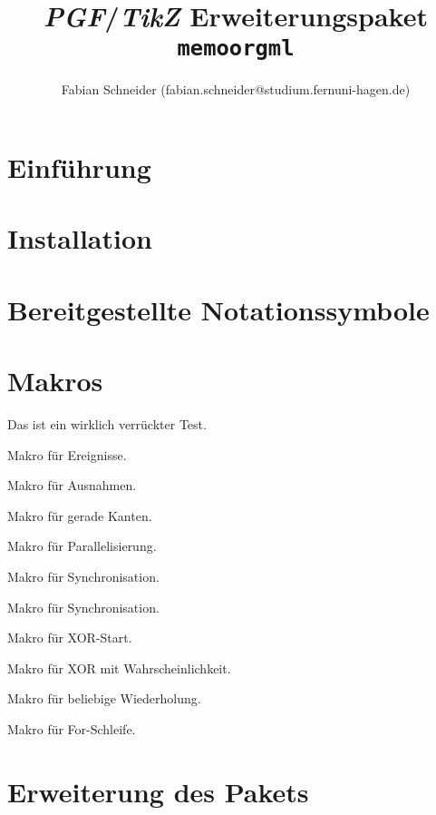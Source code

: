 \documentclass[11pt]{article}
\begin{document}
\begin{titlepage}
\title{\textit{PGF}/\textit{TikZ} Erweiterungspaket \texttt{memoorgml}} 
\author{Fabian Schneider (fabian.schneider@studium.fernuni-hagen.de)}   
\end{titlepage}
\maketitle

\section{Einführung}
\label{sec:Einführung}

\section{Installation}
\label{sec:Installation}

\section{Bereitgestellte Notationssymbole}
\label{sec:Notationssymbole}

\section{Makros}
\label{sec:Makros}
\DescribeMacro{\memoprocess} Das ist ein wirklich verrückter Test.\bigskip

\DescribeMacro{\memoevent} Makro für Ereignisse.\bigskip

\DescribeMacro{\memoexception} Makro für Ausnahmen.\bigskip

\DescribeMacro{\memoconn} Makro für gerade Kanten.\bigskip

\DescribeMacro{\memoparaconn} Makro für Parallelisierung.\bigskip

\DescribeMacro{\memosync} Makro für Synchronisation.\bigskip

\DescribeMacro{\memoconnsync} Makro für Synchronisation.\bigskip

\DescribeMacro{\memoconnxor} Makro für XOR-Start.\bigskip

\DescribeMacro{\memoconnxorprobability} Makro für XOR mit Wahrscheinlichkeit.\bigskip

\DescribeMacro{\memoiterationuntil} Makro für beliebige Wiederholung.\bigskip

\DescribeMacro{\memoiterationloop} Makro für For-Schleife.\bigskip

\section{Erweiterung des Pakets}
\label{sec:Erweiterung}
\end{document}

